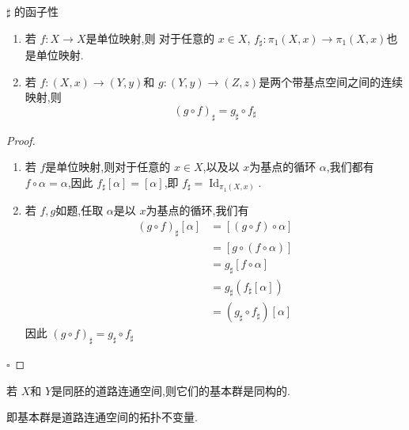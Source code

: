 \documentclass[../../几何与拓扑.tex]{subfiles}
\begin{document}
\begin{theorem}{\(  \sharp   \) 的函子性  }
    \begin{enumerate}
        \item 若 \(  f:X\to X  \)是单位映射,则 对于任意的 \(  x \in X  \), \(  f_{\sharp }: \pi _1 \left( X,x \right)\to \pi _1 \left( X,x \right)    \)也是单位映射.
        \item 若 \(  f:\left( X,x \right)\to \left( Y,y \right)    \)和 \(  g:\left( Y,y \right)\to \left( Z,z \right)    \)是两个带基点空间之间的连续映射,则 \[
        \left( g\circ f \right)_{\sharp }  = g_{\sharp }\circ f_{\sharp } 
        \]     
    \end{enumerate}
    
    
\end{theorem}

\begin{proof}

    \begin{enumerate}
        \item 若 \(  f  \)是单位映射,则对于任意的 \(  x \in X  \),以及以 \(  x  \)为基点的循环 \(  \alpha   \),我们都有 \(  f\circ \alpha  =  \alpha   \),因此 \(  f_{\sharp }[\alpha ]= [\alpha ]  \),即 \(  f_{\sharp } =  \operatorname{Id}_{\pi _1 \left( X,x \right) }  \). 
        \item 若 \(  f,g  \)如题,任取 \(  \alpha   \)是以 \(  x  \)为基点的循环,我们有 \[
        \begin{aligned}
        \left( g\circ f \right)_{\sharp }[\alpha ]&=  [\left( g\circ f \right) \circ \alpha ]\\ 
           & =   [g\circ \left( f\circ \alpha  \right) ]\\ 
            & =  g_{\sharp } [f\circ \alpha ]\\ 
             & =  g_{\sharp } \left( f_{\sharp }[\alpha ] \right)\\ 
              & =  \left( g_{\sharp }\circ f_{\sharp } \right)[\alpha ]  
        \end{aligned}
        \]       因此 \(  \left( g\circ f \right)_{\sharp } =  g_{\sharp }\circ f_{\sharp }   \)   
    \end{enumerate}
    

    \hfill $\square$
\end{proof}


\begin{theorem}
    若 \(  X  \)和 \(  Y  \)是同胚的道路连通空间,则它们的基本群是同构的.    
\end{theorem}
\begin{remark}
    即基本群是道路连通空间的拓扑不变量.
\end{remark}
\end{document}
